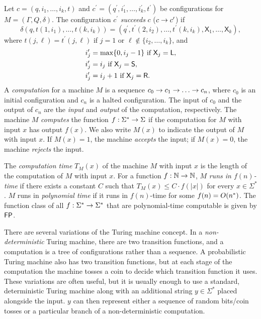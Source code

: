 Let $c=(q,i_1,\ldots,i_k,t)$ and
$c^\prime=(q^\prime,i_1^\prime,\ldots,i_k^\prime,t^\prime)$ be configurations
for $M=(\Gamma, Q,\delta)$. The configuration $c^\prime$ \textit{succeeds} $c$
($c\rightarrow c^\prime$) if
\[
\delta(q,t(1,i_1),\ldots,t(k,i_k))=
(q^\prime,t^\prime(2,i_2),\ldots,t^\prime(k,i_k),
\mathsf{X}_1,\ldots,\mathsf{X}_k),
\]
where $t(j,\ell)=t^\prime(j,\ell)$ if $j=1$ or $\ell\not\in\{i_2,\ldots,i_k\}$,
and
\begin{align*}
i_j^\prime &=\max\{0,i_j-1\}\text{ if }\mathsf{X}_j=\mathsf{L}, \\
i_j^\prime &=i_j\text{ if }\mathsf{X}_j=\mathsf{S}, \\
i_j^\prime &=i_j+1\text{ if }\mathsf{X}_j=\mathsf{R}.
\end{align*}
A \textit{computation} for a machine $M$ is a sequence $c_0\rightarrow c_1\rightarrow\ldots\rightarrow 
c_n$, where $c_0$ is an initial configuration and $c_n$ is a halted 
configuration. The input of $c_0$ and the output of $c_n$ are the \textit{input}
and \textit{output} of the computation, respectively. The machine $M$ 
\textit{computes} the function $f:\Sigma^*\rightarrow\Sigma$ if the computation for $M$ 
with input $x$ has output $f(x)$. We also write $M(x)$ to indicate the output of
$M$ with input $x$. If $M(x)=1$, the machine \textit{accepts} the input; if
$M(x)=0$, the machine \textit{rejects} the input.

The \textit{computation time} $T_M(x)$ of the machine $M$ with input $x$ is the 
length of the computation of $M$ with input $x$. For a function $f:\mathbb{N}\rightarrow\mathbb{N}$, $M$
\textit{runs in $f(n)$-time} if there exists a constant $C$ such that 
$T_M(x)\leq C\cdot f(|x|)$ for every $x\in\Sigma^*$. $M$ runs in 
\textit{polynomial time} if it runs in $f(n)$-time for some $f(n)=O(n^*)$. The 
function class of all $f:\Sigma^*\rightarrow\Sigma^*$ that are polynomial-time 
computable is given by $\mathsf{FP}$.

There are several variations of the Turing machine concept. In a 
\textit{non-deterministic} Turing machine, there are two transition functions, 
and a computation is a tree of configurations rather than a sequence. A 
probabilistic Turing machine also has two transition functions, but at each 
stage of the computation the machine tosses a coin to decide which transition 
function it uses. These variations are often useful, but it is usually enough to
use a standard, deterministic Turing machine along with an additional string 
$y\in\Sigma^*$ placed alongside the input. $y$ can then represent either a 
sequence of random bits/coin tosses or a particular branch of a 
non-deterministic computation.


